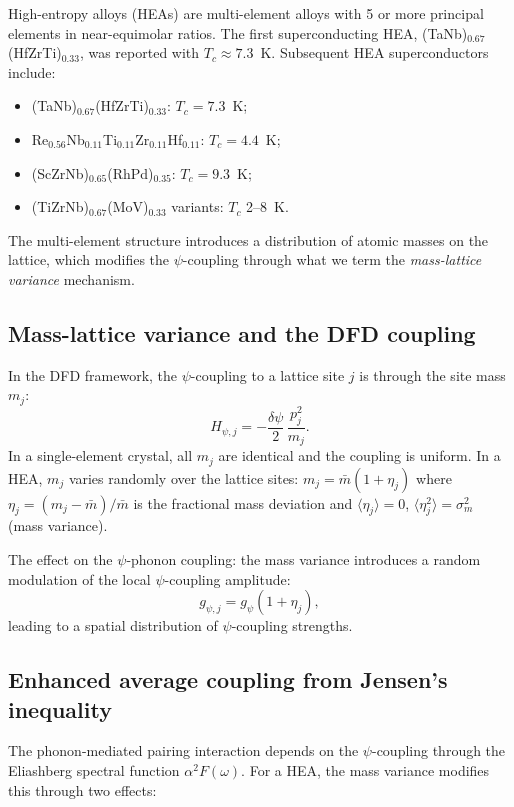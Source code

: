 \documentclass[11pt]{article}
\begin{document}
High-entropy alloys (HEAs) are multi-element alloys with 5 or more
principal elements in near-equimolar ratios. The first superconducting HEA,
(TaNb)$_{0.67}$(HfZrTi)$_{0.33}$, was reported with $T_c \approx 7.3$~K.
Subsequent HEA superconductors include:
\begin{itemize}
  \item (TaNb)$_{0.67}$(HfZrTi)$_{0.33}$: $T_c = 7.3$~K;
  \item Re$_{0.56}$Nb$_{0.11}$Ti$_{0.11}$Zr$_{0.11}$Hf$_{0.11}$: $T_c = 4.4$~K;
  \item (ScZrNb)$_{0.65}$(RhPd)$_{0.35}$: $T_c = 9.3$~K;
  \item (TiZrNb)$_{0.67}$(MoV)$_{0.33}$ variants: $T_c$ 2--8~K.
\end{itemize}
The multi-element structure introduces a distribution of atomic masses on
the lattice, which modifies the $\psi$-coupling through what we term the
\emph{mass-lattice variance} mechanism.

\subsection{Mass-lattice variance and the DFD coupling}

In the DFD framework, the $\psi$-coupling to a lattice site $j$ is through
the site mass $m_j$:
\begin{equation}
H_{\psi,j} = -\frac{\delta\psi}{2}\,\frac{p_j^2}{m_j}.
\label{eq:H-psi-site}
\end{equation}
In a single-element crystal, all $m_j$ are identical and the coupling is
uniform. In a HEA, $m_j$ varies randomly over the lattice sites:
$m_j = \bar{m}(1 + \eta_j)$ where $\eta_j = (m_j - \bar{m})/\bar{m}$ is
the fractional mass deviation and $\langle\eta_j\rangle = 0$,
$\langle\eta_j^2\rangle = \sigma_m^2$ (mass variance).

The effect on the $\psi$-phonon coupling: the mass variance introduces
a random modulation of the local $\psi$-coupling amplitude:
\begin{equation}
g_{\psi,j} = g_\psi(1 + \eta_j),
\label{eq:g-psi-HEA}
\end{equation}
leading to a spatial distribution of $\psi$-coupling strengths.

\subsection{Enhanced average coupling from Jensen's inequality}

The phonon-mediated pairing interaction depends on the $\psi$-coupling
through the Eliashberg spectral function $\alpha^2 F(\omega)$. For a HEA,
the mass variance modifies this through two effects:
\end{document}
